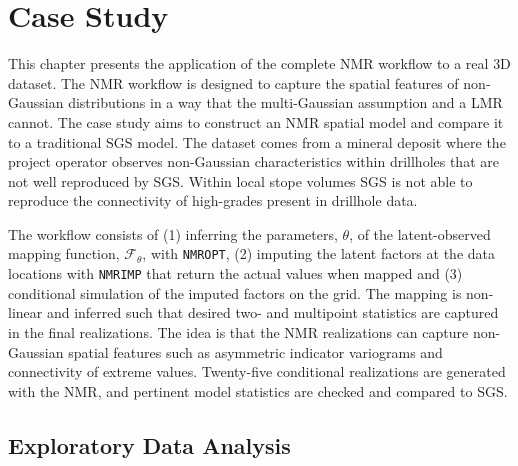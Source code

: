 
\chapter{Case Study}
\label{ch:06casestudy}

This chapter presents the application of the complete \gls{NMR} workflow to a real \gls{3D} dataset. The \gls{NMR} workflow is designed to capture the spatial features of non‐Gaussian distributions in a way that the multi-Gaussian assumption and a \gls{LMR} cannot. The case study aims to construct an \gls{NMR} spatial model and compare it to a traditional \gls{SGS} model. The dataset comes from a mineral deposit where the project operator observes non-Gaussian characteristics within drillholes that are not well reproduced by \gls{SGS}. Within local stope volumes \gls{SGS} is not able to reproduce the connectivity of high-grades present in drillhole data.

The workflow consists of (1) inferring the parameters, $\theta$, of the latent-observed mapping function, $\mathcal{F}_{\theta}$, with \texttt{NMROPT}, (2) imputing the latent factors at the data locations with \texttt{NMRIMP} that return the actual values when mapped and (3) conditional simulation of the imputed factors on the grid. The mapping is non-linear and inferred such that desired two- and multipoint statistics are captured in the final realizations. The idea is that the \gls{NMR} realizations can capture non-Gaussian spatial features such as asymmetric indicator variograms and connectivity of extreme values. Twenty-five conditional realizations are generated with the \gls{NMR}, and pertinent model statistics are checked and compared to \gls{SGS}.

\FloatBarrier
\section{Exploratory Data Analysis}
\label{sec:eda}

